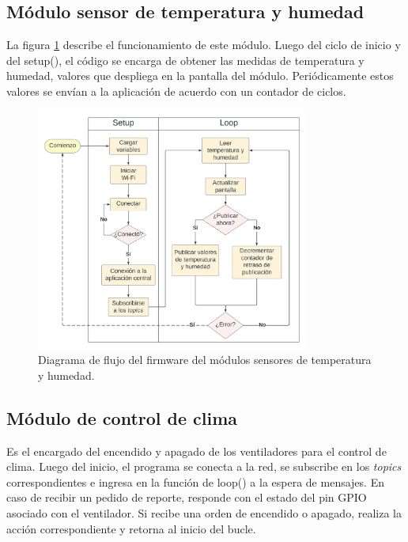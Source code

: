 \pagebreak
\subsection{Módulo sensor de temperatura y humedad}
\label{Módulo sensor de temperatura y humedad}

La figura \ref{fig:flow_tempsensor} describe el funcionamiento de este módulo. Luego del ciclo de inicio y del setup(), el código se encarga de obtener las medidas de temperatura y humedad, valores que despliega en la pantalla del módulo. Periódicamente estos valores se envían a la aplicación de acuerdo con un contador de ciclos. 


\begin{figure}[!h]
	\centering
	\includegraphics[width=0.8\textwidth]{./Figures/chapter3/FirmwareTempSensor.jpg}
	\caption[Diagrama de flujo del firmware del módulos sensores de temperatura y humedad]{Diagrama de flujo del firmware del módulos sensores de temperatura y humedad.}
	\label{fig:flow_tempsensor}
\end{figure}

\pagebreak
\subsection{Módulo de control de clima}
\label{Módulo de control de clima}

Es el encargado del encendido y apagado de los ventiladores para el control de clima.
Luego del inicio, el programa se conecta a la red, se subscribe en los \textit{topics} correspondientes e ingresa en la función de loop() a la espera de mensajes. En caso de recibir un pedido de reporte, responde con el estado del pin GPIO asociado con el ventilador. Si recibe una orden de encendido o apagado, realiza la acción correspondiente y retorna al inicio del bucle.

